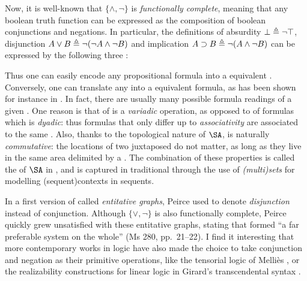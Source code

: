 \AP
Now, it is well-known that $\{\land,\neg\}$ is \emph{functionally complete},
meaning that any boolean truth function can be expressed as the composition of
boolean conjunctions and negations. In particular, the  definitions of
absurdity $\bot \triangleq \neg\top$,  disjunction $A \lor B \triangleq
\neg(\neg A \land \neg B)$ and  implication $A \supset B \triangleq \neg (A
\land \neg B)$ can be expressed by the following three :
Thus one can easily encode any propositional formula into a 
equivalent . Conversely, one can translate any  into a
 equivalent formula, as has been shown for instance in
. In fact, there are usually many
possible formula readings of a given . One reason is that
 of  is a \emph{variadic} operation, as opposed to
 of formulas which is \emph{dyadic}: thus formulas that only
differ up to \emph{associativity} are associated to the same . Also,
thanks to the topological nature of $\SA$,  is naturally
\emph{commutative}: the locations of two juxtaposed  do not matter,
as long as they live in the same area delimited by a . The combination
of these properties is called the  of $\SA$ in
, and is captured in traditional 
through the use of \emph{(multi)sets} for modelling \kl(sequent){contexts} in sequents.

\begin{remark}
  
  In a first version of  called \emph{entitative graphs}, Peirce used
   to denote \emph{disjunction} instead of conjunction.
  Although $\{\lor,\neg\}$ is also functionally complete, Peirce quickly grew
  unsatisfied with these entitative graphs, stating that  formed ``a far
  preferable system on the whole'' (Ms 280, pp.~21--22). I find it interesting
  that more contemporary works in logic have also made the choice to take
  conjunction and negation as their primitive operations, like the tensorial
  logic of Melliès \cite{mellies_micrological_2017}, or the realizability
  constructions for linear logic in Girard's transcendental syntax
  \cite{eng_stellar_2020}.
\end{remark}

